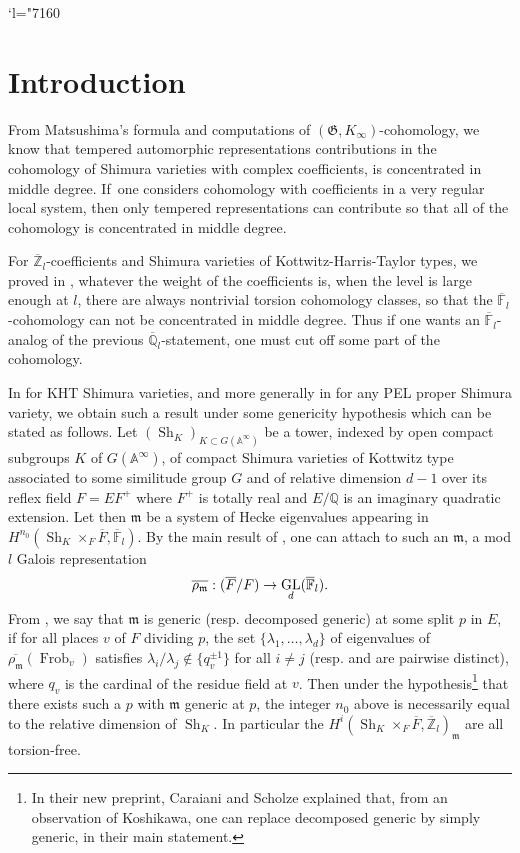 \documentclass[11pt]{article}
\newcommand{\resp}{resp.\xspace}
\newcommand{\Changel}{\mathcode`l="7160}
\newcommand{\NoChangel}[1]{%
\expandafter\let\csname old\string#1\endcsname=#1
\let#1=\relax
\newcommand{#1}{\mathcode`l="716C\csname old\string#1\endcsname\mathcode`l="7160 }%
}
\DeclareMathOperator{\GL}{GL}
\theoremstyle{plain}
\theoremstyle{definition}
\numberwithin{equation}{subsection}
\newcommand\Am{{\mathbb A}}
\newcommand\Fm{{\mathbb F}}
\newcommand\Qm{{\mathbb Q}}
\newcommand\Zm{{\mathbb Z}}
\DeclareMathOperator{\sh}{Sh}
\DeclareMathOperator{\frob}{Frob}
\DeclareMathOperator{\gal}{Gal}\NoChangel{\gal}
\let \oo=\infty
\begin{document}
\Changel
\section*{Introduction}

From Matsushima's formula and computations of $(\mathfrak G,K_\oo)$-cohomology,
we know that tempered automorphic representations contributions in the cohomology
of Shimura varieties with complex coefficients, is concentrated in middle degree.
If~one considers cohomology with coefficients in a very regular local system, then
only tempered representations can contribute so that all of the cohomology is concentrated
in middle degree.

For $\overline \Zm_l$-coefficients and Shimura varieties of Kottwitz-Harris-Taylor types,
we proved in \cite{boyer-stabilization}, whatever the weight of
the coefficients is, when the level is large enough at $l$, there are always nontrivial torsion
cohomology classes, so that the $\overline \Fm_l$\nobreakdash-co\-ho\-mology can not be concentrated in middle
degree. Thus if one wants an $\overline \Fm_l$-analog of the previous $\overline \Qm_l$-statement,
one must cut off some part of the cohomology.

In \cite{boyer-imj} for KHT Shimura varieties, and more generally
in \cite{scholze-cara} for any PEL proper Shimura variety, we obtain such a result
under some genericity hypothesis which can be stated as follows.
Let $(\sh_K)_{K \subset G(\Am^\oo)}$ be a tower, indexed by open compact subgroups
$K$ of $G(\Am^\oo)$, of compact Shimura varieties of Kottwitz type associated to some
similitude group $G$ and of relative dimension $d-1$ over its reflex field $F=EF^+$
where $F^+$ is totally real and $E/\Qm$ is an imaginary quadratic extension.
Let then $\mathfrak m$ be a system of Hecke eigenvalues appearing in
$H^{n_0}(\sh_K \times_F \overline F,\overline \Fm_l)$.
By the main result of \cite{scholze-torsion}, one can attach to such an $\mathfrak m$,
a mod $l$ Galois representation
\[
\overline{\rho_{\mathfrak m}}: \gal(\overline F/F) \to \GL_d(\overline \Fm_l).
\]
From \cite[Def.\,19]{scholze-cara},
we say that $\mathfrak m$ is generic (\resp decomposed generic) at some split $p$ in $E$,
if for all places $v$ of $F$ dividing $p$,
the set $\{\lambda_1,\dots,\lambda_d\}$ of eigenvalues of
$\overline{\rho_{\mathfrak m}}(\frob_v)$
satisfies $\lambda_i/\lambda_j \not \in \{q_v^{\pm 1}\}$ for all $i \neq j$
(\resp and are pairwise distinct), where $q_v$ is the cardinal
of the residue field at $v$. Then under the hypothesis\footnote{In their new preprint, Caraiani and Scholze explained that, from an observation of Koshikawa, one can replace decomposed generic
by simply generic, in their main statement.} that there exists such a $p$ with
$\mathfrak m$ generic at $p$, the integer $n_0$ above is necessarily equal to
the relative dimension of $\sh_K$. In particular the
$H^i(\sh_K \times_F \overline F,\overline \Zm_l)_{\mathfrak m}$
are all torsion-free.
\end{document}
